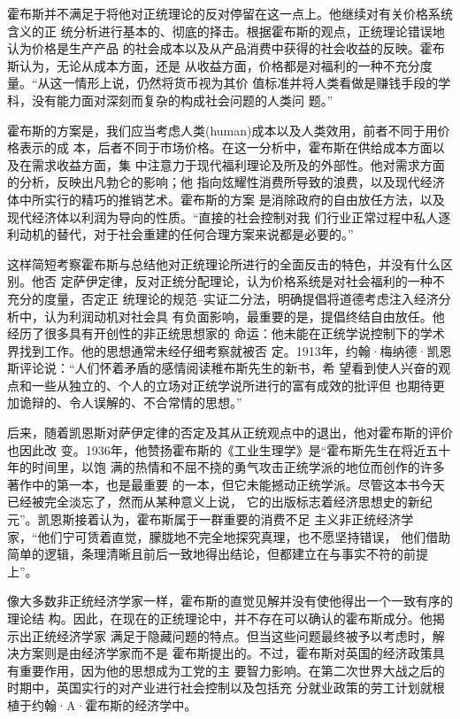 霍布斯并不满足于将他对正统理论的反对停留在这一点上。他继续对有关价格系统含义的正
统分析进行基本的、彻底的择击。根据霍布斯的观点，正统理论错误地认为价格是生产产品
的社会成本以及从产品消费中获得的社会收益的反映。霍布斯认为，无论从成本方面，还是
从收益方面，价格都是对福利的一种不充分度量。“从这一情形上说，仍然将货币视为其价
值标准并将人类看做是赚钱手段的学科，没有能力面对深刻而复杂的构成社会问题的人类问
题。”

霍布斯的方案是，我们应当考虑人类(human)成本以及人类效用，前者不同于用价格表示的成
本，后者不同于市场价格。在这一分析中，霍布斯在供给成本方面以及在需求收益方面，集
中注意力于现代福利理论及所及的外部性。他对需求方面的分析，反映出凡勃仑的影响；他
指向炫耀性消费所导致的浪费，以及现代经济体中所实行的精巧的推销艺术。霍布斯的方案
是消除政府的自由放任方法，以及现代经济体以利润为导向的性质。“直接的社会控制对我
们行业正常过程中私人逐利动机的替代，对于社会重建的任何合理方案来说都是必要的。”

这样简短考察霍布斯与总结他对正统理论所进行的全面反击的特色，并没有什么区别。他否
定萨伊定律，反对正统分配理论，认为价格系统是对社会福利的一种不充分的度量，否定正
统理论的规范--实证二分法，明确提倡将道德考虑注入经济分析中，认为利润动机对社会具
有负面影响，最重要的是，提倡终结自由放任。他经历了很多具有开创性的非正统思想家的
命运：他未能在正统学说控制下的学术界找到工作。他的思想通常未经仔细考察就被否
定。1913年，约翰·梅纳德·凯恩斯评论说：“人们怀着矛盾的感情阅读稚布斯先生的新书，希
望看到使人兴奋的观点和一些从独立的、个人的立场对正统学说所进行的富有成效的批评但
也期待更加诡辩的、令人误解的、不合常情的思想。”

后来，随着凯恩斯对萨伊定律的否定及其从正统观点中的退出，他对霍布斯的评价也因此改
变。1936年，他赞扬霍布斯的《工业生理学》是“霍布斯先生在将近五十年的时间里，以饱
满的热情和不屈不挠的勇气攻击正统学派的地位而创作的许多著作中的第一本，也是最重要
的一本，但它未能撼动正统学派。尽管这本书今天已经被完全淡忘了，然而从某种意义上说，
它的出版标志着经济思想史的新纪元”。凯恩斯接着认为，霍布斯属于一群重要的消费不足
主义非正统经济学家，“他们宁可赁着直觉，朦胧地不完全地探究真理，也不愿坚持错误，
他们借助简单的逻辑，条理清晰且前后一致地得出结论，但都建立在与事实不符的前提
上”。


像大多数非正统经济学家一样，霍布斯的直觉见解并没有使他得出一个一致有序的理论结
构。因此，在现在的正统理论中，并不存在可以确认的霍布斯成分。他揭示出正统经济学家
满足于隐藏问题的特点。但当这些问题最终被予以考虑时，解决方案则是由经济学家而不是
霍布斯提出的。不过，霍布斯对英国的经济政策具有重要作用，因为他的思想成为工党的主
要智力影响。在第二次世界大战之后的时期中，英国实行的对产业进行社会控制以及包括充
分就业政策的劳工计划就根植于约翰·A·霍布斯的经济学中。

